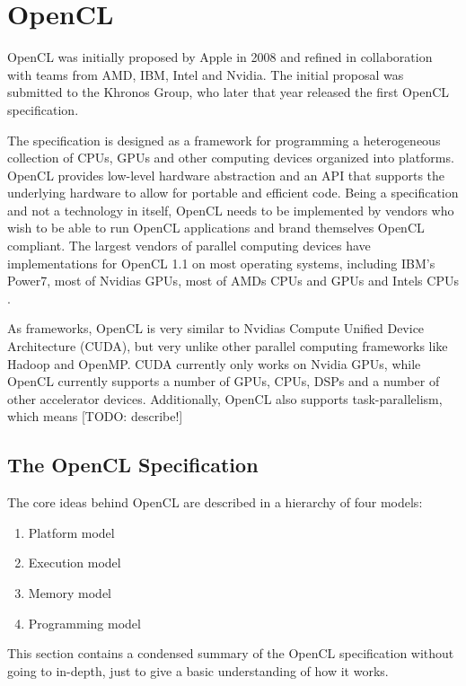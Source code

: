 \section{OpenCL}

OpenCL was initially proposed by Apple in 2008 and refined in
collaboration with teams from AMD, IBM, Intel and Nvidia. The initial
proposal was submitted to the Khronos Group\cite{cl-spec}, who later
that year released the first OpenCL specification.

The specification is designed as a framework for programming a
heterogeneous collection of CPUs, GPUs and other computing devices
organized into platforms. OpenCL provides low-level hardware
abstraction and an API that supports the underlying hardware to allow
for portable and efficient code. Being a specification and not a
technology in itself, OpenCL needs to be implemented by vendors who
wish to be able to run OpenCL applications and brand themselves OpenCL
compliant. The largest vendors of parallel computing devices have
implementations for OpenCL 1.1 on most operating systems, including
IBM's Power7\cite{ibm-opencl}, most of Nvidias
GPUs\cite{nvidia-opencl}, most of AMDs CPUs and GPUs \cite{amd-opencl}
and Intels CPUs \cite{intel-opencl}.

As frameworks, OpenCL is very similar to Nvidias Compute Unified
Device Architecture (CUDA), but very unlike other parallel computing
frameworks like Hadoop\cite{hadoop} and OpenMP\cite{openmp}. CUDA
currently only works on Nvidia GPUs, while OpenCL currently supports a
number of GPUs, CPUs, DSPs and a number of other accelerator devices.
Additionally, OpenCL also supports task-parallelism, which means
[TODO: describe!]

\subsection{The OpenCL Specification}

The core ideas behind OpenCL are described in a hierarchy of four
models\cite{cl-spec}:

\begin{enumerate}
  \item Platform model
  \item Execution model
  \item Memory model
  \item Programming model
\end{enumerate}

This section contains a condensed summary of the OpenCL specification
without going to in-depth, just to give a basic understanding of how
it works.


